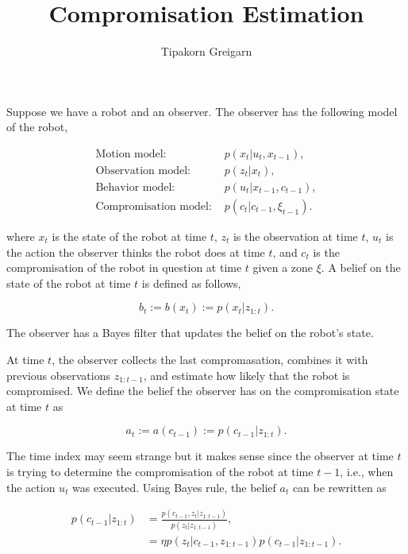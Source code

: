 \documentclass{article}
\title{Compromisation Estimation}
\author{Tipakorn Greigarn}
\begin{document}
\maketitle
Suppose we have a robot and an observer.
The observer has the following model of the robot,

\begin{align}
  \text{Motion model: }& 
  p(x_{t}| u_{t}, x_{t-1}) 
  \label{eqn:model-motion},                                  \\
  \text{Observation model: }& 
  p(z_{t}| x_{t}) 
  \label{eqn:model-observation},                             \\
  \text{Behavior model: }& 
  p(u_{t}| x_{t-1}, c_{t-1}) 
  \label{eqn:model-behavior},                                \\
  \text{Compromisation model: }& 
  p(c_{t}| c_{t-1}, \xi_{t-1}) 
  \label{eqn:model-Compromization}.
\end{align}

where $x_{t}$ is the state of the robot at time $t$, $z_{t}$ is the observation at time $t$, $u_{t}$ is the action the observer thinks the robot does at time $t$, and $c_{t}$ is the compromisation of the robot in question at time $t$ given a zone $\xi$.
A belief on the state of the robot at time $t$ is defined as follows,

\begin{equation}
  b_{t} := b(x_t) := p(x_t| z_{1:t}).
  \label{eqn:state-belief}
\end{equation}

The observer has a Bayes filter that updates the belief on the robot's state.

At time $t$, the observer collects the last compromasation, combines it with previous observations $z_{1:t-1}$, and estimate how likely that the robot is compromised.
We define the belief the observer has on the compromisation state at time $t$ as

\begin{equation}
  a_{t} := a(c_{t-1}) := p(c_{t-1}| z_{1:t}).
  \label{eqn:compromisation-belief}
\end{equation}

The time index may seem strange but it makes sense since the observer at time $t$ is trying to determine the compromisation of the robot at time $t-1$, i.e., when the action $u_{t}$ was executed.
Using Bayes rule, the belief $a_{t}$ can be rewritten as

\begin{align}
  p(c_{t-1}|z_{1:t})
  &= \frac
  {p(c_{t-1},z_{t}| z_{1:t-1})}
  {p(z_{t}| z_{1:t-1})}, 
  \label{eqn:bayes-inversion-1}                             \\
  &= \eta 
  p(z_{t}| c_{t-1}, z_{1:t-1}) 
  p(c_{t-1}| z_{1:t-1}). 
  \label{eqn:bayes-inversion-2}
\end{align}
\end{document}
